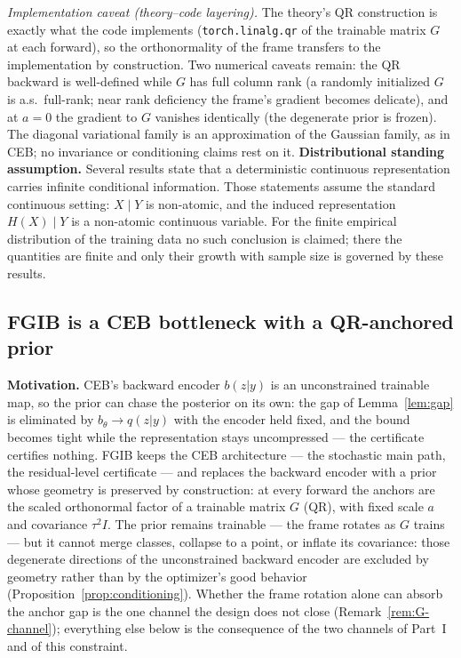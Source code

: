 \emph{Implementation caveat (theory--code layering).} The theory's QR construction is
exactly what the code implements (\texttt{torch.linalg.qr} of the trainable matrix $G$
at each forward), so the orthonormality of the frame transfers to the implementation by
construction. Two numerical caveats remain: the QR backward is well-defined while $G$
has full column rank (a randomly initialized $G$ is a.s.\ full-rank; near rank
deficiency the frame's gradient becomes delicate), and at $a = 0$ the gradient to $G$
vanishes identically (the degenerate prior is frozen). The diagonal variational family
is an approximation of the Gaussian family, as in CEB; no invariance or conditioning
claims rest on it.
\textbf{Distributional standing assumption.} Several results state that a deterministic
continuous representation carries infinite conditional information. Those statements
assume the standard continuous setting: $X \mid Y$ is non-atomic, and the induced
representation $H(X) \mid Y$ is a non-atomic continuous variable. For the finite
empirical distribution of the training data no such conclusion is claimed; there the
quantities are finite and only their growth with sample size is governed by these
results.

\subsection{FGIB is a CEB bottleneck with a QR-anchored prior}

\textbf{Motivation.}
CEB's backward encoder $b(z|y)$ is an unconstrained trainable map, so the prior can
chase the posterior on its own: the gap of Lemma~\ref{lem:gap} is eliminated by
$b_\theta \to q(z|y)$ with the encoder held fixed, and the bound becomes tight while
the representation stays uncompressed --- the certificate certifies nothing. FGIB keeps
the CEB architecture --- the stochastic main path, the residual-level certificate ---
and replaces the backward encoder with a prior whose geometry is preserved by
construction: at every forward the anchors are the scaled orthonormal factor of a
trainable matrix $G$ (QR), with fixed scale $a$ and covariance $\tau^2 I$. The prior
remains trainable --- the frame rotates as $G$ trains --- but it cannot merge classes,
collapse to a point, or inflate its covariance: those degenerate directions of the
unconstrained backward encoder are excluded by geometry rather than by the optimizer's
good behavior (Proposition~\ref{prop:conditioning}). Whether the frame rotation alone
can absorb the anchor gap is the one channel the design does not close
(Remark~\ref{rem:G-channel}); everything else below is the consequence of the two
channels of Part~I and of this constraint.

